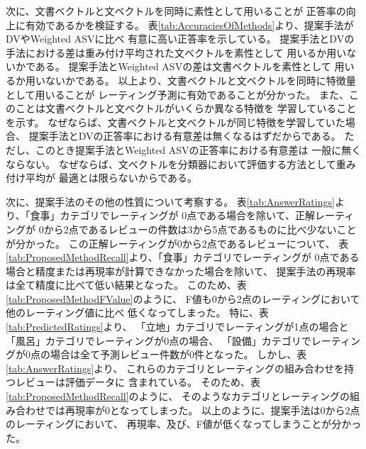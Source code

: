 次に、文書ベクトルと文ベクトルを同時に素性として用いることが
正答率の向上に有効であるかを検証する。
表\ref{tab:AccuraciesOfMethods}より、提案手法がDVやWeighted ASVに比べ
有意に高い正答率を示している。
提案手法とDVの手法における差は重み付け平均された文ベクトルを素性として
用いるか用いないかである。
提案手法とWeighted ASVの差は文書ベクトルを素性として
用いるか用いないかである。
以上より、文書ベクトルと文ベクトルを同時に特徴量として用いることが
レーティング予測に有効であることが分かった。
また、このことは文書ベクトルと文ベクトルがいくらか異なる特徴を
学習していることを示す。
なぜならば、文書ベクトルと文ベクトルが同じ特徴を学習していた場合、
提案手法とDVの正答率における有意差は無くなるはずだからである。
ただし、このとき提案手法とWeighted ASVの正答率における有意差は
一般に無くならない。
なぜならば、文ベクトルを分類器において評価する方法として重み付け平均が
最適とは限らないからである。

次に、提案手法のその他の性質について考察する。
%
表\ref{tab:AnswerRatings}より、「食事」カテゴリでレーティングが
0点である場合を除いて、正解レーティングが
0から2点であるレビューの件数は3から5点であるものに比べ少ないことが分かった。
この正解レーティングが0から2点であるレビューについて、
表\ref{tab:ProposedMethodRecall}より、「食事」カテゴリでレーティングが
0点である場合と精度または再現率が計算できなかった場合を除いて、
提案手法の再現率は全て精度に比べて低い結果となった。
このため、表\ref{tab:ProposedMethodFValue}のように、
F値も0から2点のレーティングにおいて他のレーティング値に比べ
低くなってしまった。
%
特に、表\ref{tab:PredictedRatings}より、
「立地」カテゴリでレーティングが1点の場合と
「風呂」カテゴリでレーティングが0点の場合、
「設備」カテゴリでレーティングが0点の場合は全て予測レビュー件数が0件となった。
しかし、表\ref{tab:AnswerRatings}より、
これらのカテゴリとレーティングの組み合わせを持つレビューは評価データに
含まれている。
そのため、表\ref{tab:ProposedMethodRecall}のように、
そのようなカテゴリとレーティングの組み合わせでは再現率が0となってしまった。
%
以上のように、提案手法は0から2点のレーティングにおいて、
再現率、及び、F値が低くなってしまうことが分かった。

